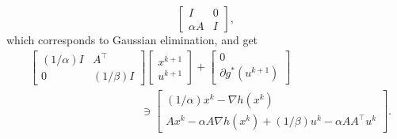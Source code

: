 \documentclass[10pt,mathserif]{beamer}
\begin{document}
\begin{frame}
\[\begin{bmatrix}
I&0\\
\alpha A&I
\end{bmatrix},
\]
which corresponds to Gaussian elimination,
and get
\begin{align*}
  &\begin{bmatrix}
    (1/\alpha)I & A^\intercal  \\
    0 & (1/\beta)I
  \end{bmatrix}
  \begin{bmatrix}
        x^{k+1} \\
         u ^{k+1}
  \end{bmatrix}
  +
  \begin{bmatrix}
  0\\
  \partial g^*( u ^{k+1})
  \end{bmatrix}\\
  &\qquad\qquad\qquad\qquad\qquad\ni
    \begin{bmatrix}
  (1/\alpha)x^k-\nabla h(x^k)\\
  Ax^k-\alpha A\nabla h(x^k)+
  (1/\beta) u ^k-\alpha A A^\intercal u ^k
  \end{bmatrix}.
\end{align*}
\end{frame}
\end{document}
